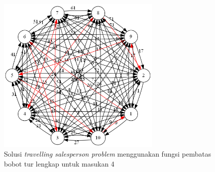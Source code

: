 \documentclass[a4paper,titlepage]{article}
\begin{document}
		\begin{figure}[H]
		    \centering
		    \includegraphics[width=0.7\textwidth]{4.png}
		    \caption{Solusi \textit{travelling salesperson problem} menggunakan fungsi pembatas bobot tur lengkap untuk masukan 4}
		    \label{fig:hasileksekusi4}
		\end{figure}
		
\end{document}
